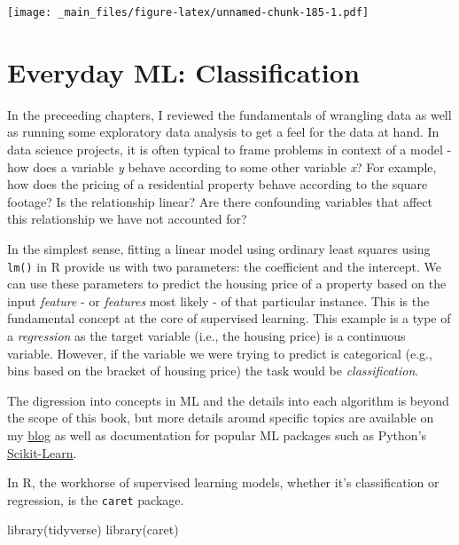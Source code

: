 \documentclass[
]{book}
\newenvironment{Shaded}{\begin{snugshade}}{\end{snugshade}}
\newcommand{\FunctionTok}[1]{\textcolor[rgb]{0.00,0.00,0.00}{#1}}
\newcommand{\NormalTok}[1]{#1}
\begin{document}
\texttt{[image: \_main\_files/figure-latex/unnamed-chunk-185-1.pdf]}

\hypertarget{everyday-ml-classification}{%
\chapter{Everyday ML: Classification}\label{everyday-ml-classification}}

In the preceeding chapters, I reviewed the fundamentals of wrangling data as well as running some exploratory data analysis to get a feel for the data at hand. In data science projects, it is often typical to frame problems in context of a model - how does a variable \emph{y} behave according to some other variable \emph{x}? For example, how does the pricing of a residential property behave according to the square footage? Is the relationship linear? Are there confounding variables that affect this relationship we have not accounted for?

In the simplest sense, fitting a linear model using ordinary least squares using \texttt{lm()} in R provide us with two parameters: the coefficient and the intercept. We can use these parameters to predict the housing price of a property based on the input \emph{feature} - or \emph{features} most likely - of that particular instance. This is the fundamental concept at the core of supervised learning. This example is a type of a \emph{regression} as the target variable (i.e., the housing price) is a continuous variable. However, if the variable we were trying to predict is categorical (e.g., bins based on the bracket of housing price) the task would be \emph{classification}.

The digression into concepts in ML and the details into each algorithm is beyond the scope of this book, but more details around specific topics are available on my \href{https://brianjmpark.github.io/}{blog} as well as documentation for popular ML packages such as Python's \href{https://scikit-learn.org/stable/}{Scikit-Learn}.

In R, the workhorse of supervised learning models, whether it's classification or regression, is the \texttt{caret} package.

\begin{Shaded}
\begin{Highlighting}[]
\FunctionTok{library}\NormalTok{(tidyverse)}
\FunctionTok{library}\NormalTok{(caret)}
\end{Highlighting}
\end{Shaded}
\end{document}
